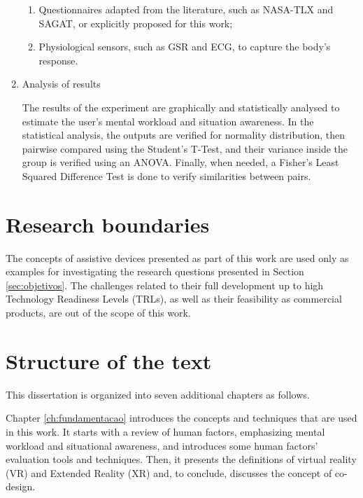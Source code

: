 \begin{enumerate}[leftmargin = 6em, label = Step \arabic* -- ]
    \begin{enumerate}[label = \alph*)]
        \item Questionnaires adapted from the literature, such as NASA-TLX and SAGAT, or explicitly proposed for this work;
        \item Physiological sensors, such as GSR and ECG, to capture the body's response.
    \end{enumerate}
    
    \item Analysis of results
    
    The results of the experiment are graphically and statistically analysed to estimate the user's mental workload and situation awareness. In the statistical analysis, the outputs are verified for normality distribution, then pairwise compared using the Student's T-Test, and their variance inside the group is verified using an ANOVA. Finally, when needed, a Fisher's Least Squared Difference Test is done to verify similarities between pairs.

\end{enumerate}


\FloatBarrier

\section{Research boundaries}


The concepts of assistive devices presented as part of this work are used only as examples for investigating the research questions presented in Section \ref{sec:objetivos}. The challenges related to their full development up to high Technology Readiness Levels (TRLs), as well as their feasibility as commercial products, are out of the scope of this work.


\section{Structure of the text}

This dissertation is organized into seven additional chapters as follows.

Chapter \ref{ch:fundamentacao} introduces the concepts and techniques that are used in this work. It starts with a review of human factors, emphasizing mental workload and situational awareness, and introduces some human factors' evaluation tools and techniques. Then, it presents the definitions of virtual reality (VR) and Extended Reality (XR) and, to conclude, discusses the concept of co-design.

